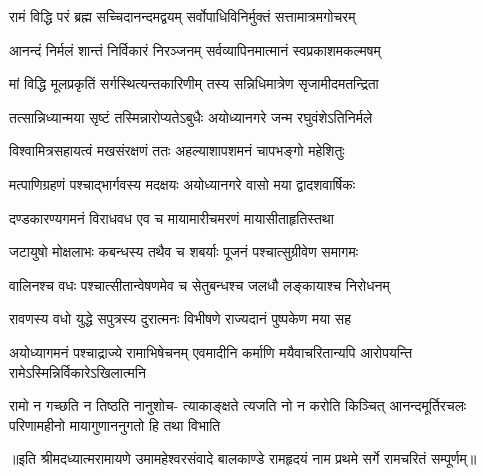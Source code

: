 

\textlink{}
\translink{}

\storymeta



\addtocounter{shlokacount}{31}

\twolineshloka
{रामं विद्धि परं ब्रह्म सच्चिदानन्दमद्वयम्}
{सर्वोपाधिविनिर्मुक्तं सत्तामात्रमगोचरम्} %

\twolineshloka
{आनन्दं निर्मलं शान्तं निर्विकारं निरञ्जनम्}
{सर्वव्यापिनमात्मानं स्वप्रकाशमकल्मषम्} %

\twolineshloka
{मां विद्धि मूलप्रकृतिं सर्गस्थित्यन्तकारिणीम्}
{तस्य सन्निधिमात्रेण सृजामीदमतन्द्रिता} %

\twolineshloka
{तत्सान्निध्यान्मया सृष्टं तस्मिन्नारोप्यतेऽबुधैः}
{अयोध्यानगरे जन्म रघुवंशेऽतिनिर्मले} %

\twolineshloka
{विश्वामित्रसहायत्वं मखसंरक्षणं ततः}
{अहल्याशापशमनं चापभङ्गो महेशितुः} %

\twolineshloka
{मत्पाणिग्रहणं पश्चाद्भार्गवस्य मदक्षयः}
{अयोध्यानगरे वासो मया द्वादशवार्षिकः} %

\twolineshloka
{दण्डकारण्यगमनं विराधवध एव च}
{मायामारीचमरणं मायासीताहृतिस्तथा} %

\twolineshloka
{जटायुषो मोक्षलाभः कबन्धस्य तथैव च}
{शबर्याः पूजनं पश्चात्सुग्रीवेण समागमः} %

\twolineshloka
{वालिनश्च वधः पश्चात्सीतान्वेषणमेव च}
{सेतुबन्धश्च जलधौ लङ्कायाश्च निरोधनम्} %

\twolineshloka
{रावणस्य वधो युद्धे सपुत्रस्य दुरात्मनः}
{विभीषणे राज्यदानं पुष्पकेण मया सह} %

\threelineshloka
{अयोध्यागमनं पश्चाद्राज्ये रामाभिषेचनम्}
{एवमादीनि कर्माणि मयैवाचरितान्यपि}
{आरोपयन्ति रामेऽस्मिन्निर्विकारेऽखिलात्मनि} %

\fourlineindentedshloka
{रामो न गच्छति न तिष्ठति नानुशोच-}
{त्याकाङ्क्षते त्यजति नो न करोति किञ्चित्}
{आनन्दमूर्तिरचलः परिणामहीनो}
{मायागुणाननुगतो हि तथा विभाति} %

॥इति श्रीमदध्यात्मरामायणे उमामहेश्वरसंवादे बालकाण्डे रामहृदयं नाम प्रथमे सर्गे रामचरितं सम्पूर्णम्॥

\closesection